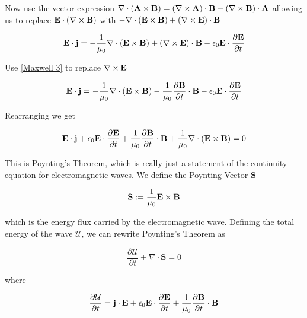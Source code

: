 Now use the vector expression $\nabla \cdot \left( \textbf{A} \times \textbf{B} \right) = \left( \nabla \times \textbf{A} \right) \cdot \textbf{B} - \left( \nabla \times \textbf{B} \right) \cdot \textbf{A}$ allowing us to replace $\textbf{E} \cdot \left( \nabla \times \textbf{B} \right)$ with $- \nabla \cdot \left( \textbf{E} \times \textbf{B} \right) + \left( \nabla \times \textbf{E} \right) \cdot \textbf{B}$

\begin{equation}
	\textbf{E} \cdot \textbf{j} = - \frac{1}{\mu_0} \nabla \cdot \left( \textbf{E} \times \textbf{B} \right) + \left( \nabla \times \textbf{E} \right) \cdot \textbf{B} - \epsilon_0 \textbf{E} \cdot \frac{\partial \textbf{E}}{\partial t}
\end{equation}

Use \eqref{Maxwell 3} to replace $\nabla \times \textbf{E}$

\begin{equation}
	\textbf{E} \cdot \textbf{j} = - \frac{1}{\mu_0} \nabla \cdot \left( \textbf{E} \times \textbf{B} \right) - \frac{1}{\mu_0} \frac{\partial \textbf{B}}{\partial t} \cdot \textbf{B} - \epsilon_0 \textbf{E} \cdot \frac{\partial \textbf{E}}{\partial t}
\end{equation}

Rearranging we get

\begin{equation}\label{Poynting's Theorem Long}
	\textbf{E} \cdot \textbf{j} + \epsilon_0 \textbf{E} \cdot \frac{\partial \textbf{E}}{\partial t} + \frac{1}{\mu_0} \frac{\partial \textbf{B}}{\partial t} \cdot \textbf{B} + \frac{1}{\mu_0} \nabla \cdot \left( \textbf{E} \times \textbf{B} \right) = 0
\end{equation}

This is Poynting's Theorem, which is really just a statement of the continuity equation for electromagnetic waves. We define the Poynting Vector $\textbf{S}$

\begin{equation}
	\textbf{S} := \frac{1}{\mu_0} \textbf{E} \times \textbf{B}
\end{equation}

which is the energy flux carried by the electromagnetic wave. Defining the total energy of the wave $\mathcal{U}$, we can rewrite Poynting's Theorem as

\begin{equation} \label{Poynting's Theorem Short}
	\frac{\partial \mathcal{U}}{\partial t} + \nabla \cdot \textbf{S} = 0
\end{equation}

where

\begin{equation}\label{Poynting's Theorem Energy Derivative}
	\frac{\partial \mathcal{U}}{\partial t} = \textbf{j} \cdot \textbf{E} + \epsilon_0 \textbf{E} \cdot \frac{\partial \textbf{E}}{\partial t} + \frac{1}{\mu_0} \frac{\partial \textbf{B}}{\partial t} \cdot \textbf{B}
\end{equation}

